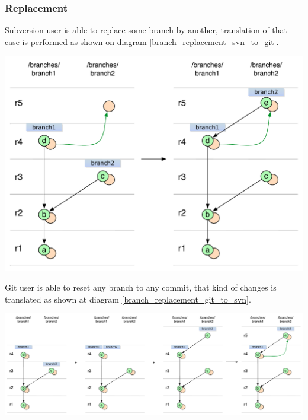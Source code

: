 \subsubsection{Replacement}

Subversion user is able to replace some branch by another, translation of that case is performed as shown on diagram \ref{branch_replacement_svn_to_git}.
\begin{center}
\includegraphics[width=\textwidth]{img/diagrams/branch_replacement_svn_to_git.pdf}%
\label{branch_replacement_svn_to_git}%
\end{center}

Git user is able to reset any branch to any commit, that kind of changes is translated as shown at diagram \ref{branch_replacement_git_to_svn}.
\begin{center}
\includegraphics[width=\textwidth]{img/diagrams/branch_replacement_git_to_svn.pdf}%
\label{branch_replacement_git_to_svn}%
\end{center}
